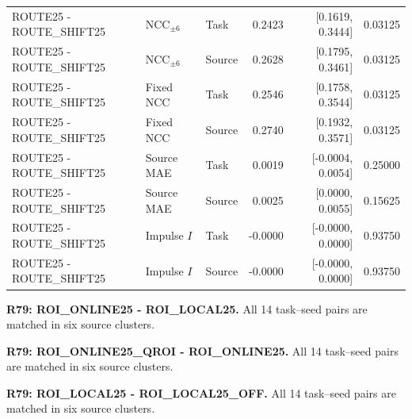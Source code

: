 \begin{longtable}{p{.27\linewidth}p{.13\linewidth}lrrr}
ROUTE25 - ROUTE\_SHIFT25 & NCC$_{\pm6}$ & Task & 0.2423 & [0.1619, 0.3444] & 0.03125 \\
ROUTE25 - ROUTE\_SHIFT25 & NCC$_{\pm6}$ & Source & 0.2628 & [0.1795, 0.3461] & 0.03125 \\
ROUTE25 - ROUTE\_SHIFT25 & Fixed NCC & Task & 0.2546 & [0.1758, 0.3544] & 0.03125 \\
ROUTE25 - ROUTE\_SHIFT25 & Fixed NCC & Source & 0.2740 & [0.1932, 0.3571] & 0.03125 \\
ROUTE25 - ROUTE\_SHIFT25 & Source MAE & Task & 0.0019 & [-0.0004, 0.0054] & 0.25000 \\
ROUTE25 - ROUTE\_SHIFT25 & Source MAE & Source & 0.0025 & [0.0000, 0.0055] & 0.15625 \\
ROUTE25 - ROUTE\_SHIFT25 & Impulse $I$ & Task & -0.0000 & [-0.0000, 0.0000] & 0.93750 \\
ROUTE25 - ROUTE\_SHIFT25 & Impulse $I$ & Source & -0.0000 & [-0.0000, 0.0000] & 0.93750 \\
\hline\end{longtable}
\endgroup

\noindent\textbf{R79: ROI\_ONLINE25 - ROI\_LOCAL25.} All 14 task--seed pairs are matched in six source clusters.

\noindent\textbf{R79: ROI\_ONLINE25\_QROI - ROI\_ONLINE25.} All 14 task--seed pairs are matched in six source clusters.

\noindent\textbf{R79: ROI\_LOCAL25 - ROI\_LOCAL25\_OFF.} All 14 task--seed pairs are matched in six source clusters.

